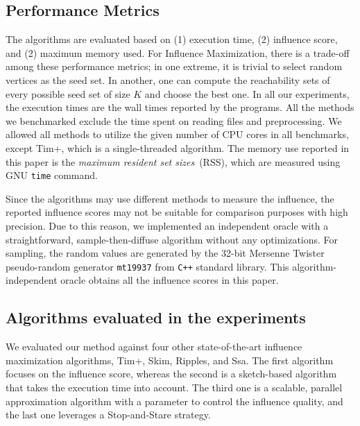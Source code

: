 \documentclass[final,5p,times,twocolumn]{elsarticle}
\newcommand\acro{{\sc{HyperFuseR\xspace}\xspace}\xspace}
\begin{document}
\subsection{Performance Metrics}

The algorithms are evaluated based on (1) execution time, (2) influence score, and (2) maximum memory used. For Influence Maximization, there is a trade-off among these performance metrics; in one extreme, it is trivial to select random vertices as the seed set. In another, one can compute the reachability sets of every possible seed set of size $K$ and choose the best one. 
In all our experiments, the execution times are the wall times reported by the programs. All the methods we benchmarked exclude the time spent on reading files and preprocessing. %
We allowed all methods to utilize the given number of CPU cores in all benchmarks, except {\sc Tim+}, which is a single-threaded algorithm. The memory use reported in this paper is the {\em maximum resident set sizes}~(RSS), which are measured using GNU {\tt time} command.

Since the algorithms may use different methods to measure the influence, the reported influence scores may not be suitable for comparison purposes with high precision. Due to this reason, we implemented an independent oracle with a straightforward, sample-then-diffuse algorithm without any optimizations. For sampling, the random values are generated by the 32-bit Mersenne Twister pseudo-random generator {\tt mt19937} from {\tt C++} standard library. This algorithm-independent oracle obtains all the influence scores in this paper.

\subsection{Algorithms evaluated in the experiments}

We evaluated our method against four other state-of-the-art influence maximization algorithms, {\sc Tim+}, {\sc Skim}, {\sc Ripples}, and {\sc Ssa}. The first algorithm focuses on the influence score, whereas the second is a sketch-based algorithm that takes the execution time into account. The third one is a scalable, parallel approximation algorithm with a parameter to control the influence quality, and the last one leverages a Stop-and-Stare strategy.
\end{document}
